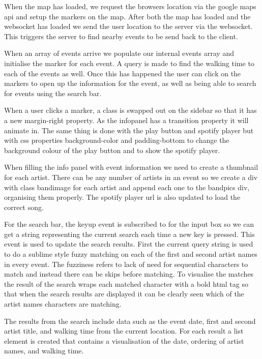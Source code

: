 \documentclass[10pt]{article}
\begin{document}
            When the map has loaded, we request the browsers location via the google maps api and setup the markers on the map. After both the map has loaded and the websocket has loaded we send the user location to the server via the websocket. This triggers the server to find nearby events to be send back to the client.

            When an array of events arrive we populate our internal events array and initialise the marker for each event. A query is made to find the walking time to each of the events as well. Once this has happened the user can click on the markers to open up the information for the event, as well as being able to search for events using the search bar.

            When a user clicks a marker, a class is swapped out on the sidebar so that it has a new margin-right property. As the infopanel has a transition property it will animate in. The same thing is done with the play button and spotify player but with css properties background-color and padding-bottom to change the background colour of the play button and to show the spotify player.

            When filling the info panel with event information we need to create a thumbnail for each artist. There can be any number of artists in an event so we create a div with class bandimage for each artist and append each one to the bandpics div, organising them properly. The spotify player url is also updated to load the correct song.

            For the search bar, the keyup event is subscribed to for the input box so we can get a string representing the current search each time a new key is pressed. This event is used to update the search results. First the current query string is used to do a sublime style fuzzy matching on each of the first and second artist names in every event. The fuzziness refers to lack of need for sequential characters to match and instead there can be skips before matching. To visualise the matches the result of the search wraps each matched character with a bold html tag so that when the search results are displayed it can be clearly seen which of the artist names characters are matching.

            The results from the search include data such as the event date, first and second artist title, and walking time from the current location. For each result a list element is created that contains a visualisation of the date, ordering of artist names, and walking time.
\end{document}
